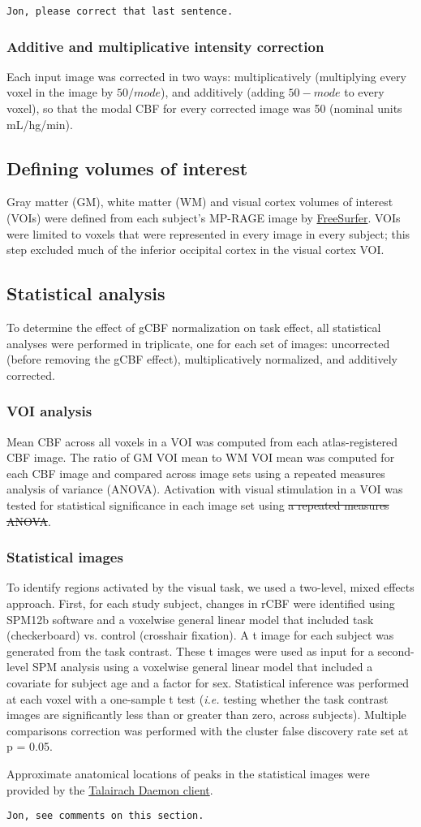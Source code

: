 \verb|Jon, please correct that last sentence.|
\subsubsection{Additive and multiplicative intensity correction}
Each input image was corrected in two ways: multiplicatively (multiplying every voxel in the image by $50/mode$), and additively (adding $50-mode$ to every voxel), so that the modal CBF for every corrected image was 50 (nominal units mL/hg/min).

\subsection{Defining volumes of interest}
Gray matter (GM), white matter (WM) and visual cortex volumes of interest (VOIs) were defined from each subject's MP-RAGE image by \href{https://surfer.nmr.mgh.harvard.edu/}{FreeSurfer}.\cite{Desikan2006968} VOIs were limited to voxels that were represented in every image in every subject; this step excluded much of the inferior occipital cortex in the visual cortex VOI.\cite{Black_2010} 

\subsection{Statistical analysis}
To determine the effect of gCBF normalization on task effect, all statistical analyses were performed in triplicate, one for each set of images: uncorrected (before removing the gCBF effect), multiplicatively normalized, and additively corrected.

\subsubsection{VOI analysis}
Mean CBF across all voxels in a VOI was computed from each atlas-registered CBF image. The ratio of GM VOI mean to WM VOI mean was computed for each CBF image and compared across image sets using a repeated measures analysis of variance (ANOVA). Activation with visual stimulation in a VOI was tested for statistical significance in each image set using \sout{a repeated measures ANOVA}. 

\subsubsection{Statistical images}
To identify regions activated by the visual task, we used a two-level, mixed effects approach.  First, for each study subject, changes in rCBF were identified using SPM12b software and a voxelwise general linear model that included task (checkerboard) vs. control (crosshair fixation). A t image for each subject was generated from the task contrast. These t images were used as input for a second-level SPM analysis using a voxelwise general linear model that included a covariate for subject age and a factor for sex. Statistical inference was performed at each voxel with a one-sample t test (\textit{i.e.} testing whether the task contrast images are significantly less than or greater than zero, across subjects). Multiple comparisons correction was performed with the cluster false discovery rate set at p = 0.05. 

Approximate anatomical locations of peaks in the statistical images were provided by the \href{http://www.talairach.org}{Talairach Daemon client}.\cite{20408222}

\verb|Jon, see comments on this section.|